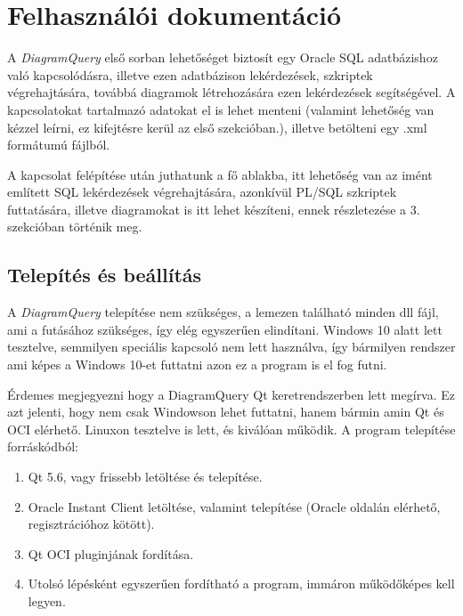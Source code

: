 \chapter{Felhasználói dokumentáció}
A \textit{DiagramQuery} első sorban lehetőséget biztosít egy Oracle SQL adatbázishoz való kapcsolódásra, illetve
ezen adatbázison lekérdezések, szkriptek végrehajtására, továbbá diagramok létrehozására ezen lekérdezések
segítségével.
A kapcsolatokat tartalmazó adatokat el is lehet menteni (valamint lehetőség van kézzel leírni,
ez kifejtésre kerül az első szekcióban.), illetve betölteni egy .xml formátumú fájlból.

A kapcsolat felépítése után juthatunk a fő ablakba, itt lehetőség van az imént említett SQL lekérdezések végrehajtására, 
azonkívül PL/SQL szkriptek futtatására,
illetve diagramokat is itt lehet készíteni, ennek részletezése a 3. szekcióban történik meg.

\section{Telepítés és beállítás}
A \textit{DiagramQuery} telepítése nem szükséges, a lemezen található minden dll fájl, ami a futásához szükséges,
így elég egyszerűen elindítani.
Windows 10 alatt lett tesztelve, semmilyen speciális kapcsoló nem lett használva, így bármilyen rendszer ami képes
a Windows 10-et futtatni azon ez a program is el fog futni.

Érdemes megjegyezni hogy a DiagramQuery Qt keretrendszerben lett megírva. Ez azt jelenti, hogy nem csak Windowson lehet
futtatni, hanem bármin amin Qt és OCI elérhető. Linuxon tesztelve is lett, és kiválóan működik. A program telepítése
forráskódból:
\begin{enumerate}
  \item Qt 5.6, vagy frissebb letöltése és telepítése.
  \item Oracle Instant Client letöltése, valamint telepítése (Oracle oldalán elérhető, regisztrációhoz kötött).
  \item Qt OCI pluginjának fordítása.
  \item Utolsó lépésként egyszerűen fordítható a program, immáron működőképes kell legyen.
\end{enumerate}

